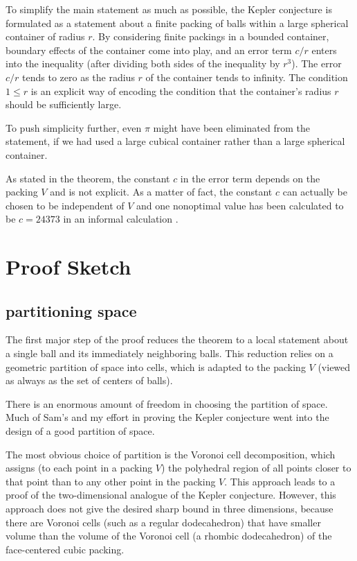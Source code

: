 \documentclass{amsart}
\begin{document}
To simplify the main statement as much as possible, the Kepler
conjecture is formulated as a statement about a finite
packing of balls within a large spherical container of radius $r$.  By
considering finite packings in a bounded container, boundary effects
of the container come into play, and an error term $c/r$ enters into
the inequality (after dividing both sides of the inequality by $r^3$).  
The error $c/r$ tends to zero as the radius $r$ of
the container tends to infinity.
The condition $1\le r$ is an explicit way of encoding the
condition that the container's radius $r$ should be sufficiently large.  

To push simplicity further, even
$\pi$ might have been eliminated from the statement, if we had used a
large cubical container rather than a large spherical container.


As stated in the theorem, the constant $c$ in the error term depends
on the packing $V$ and is not explicit.  As a matter of fact, the
constant $c$ can actually be chosen to be independent of $V$ and one nonoptimal
value has been calculated to be $c=24373$ in an informal calculation
\cite{Scharf}.





\section{Proof Sketch}

\subsection{partitioning space}

The first major step of the proof reduces the theorem to a local
statement about a single ball and its immediately neighboring balls.
This reduction relies on a geometric partition of space into cells,
which is adapted to the packing $V$ (viewed as always as the set of
centers of balls).

There is an enormous amount of freedom in choosing the partition
of space.  Much of Sam's and my effort in proving the Kepler conjecture
went into the design of a good partition of space.  

The most obvious choice of partition is the Voronoi cell
decomposition, which assigns (to each point in a packing $V$) the
polyhedral region of all points closer to that point than to any other
point in the packing $V$. This approach leads to a proof of the two-dimensional
analogue of the Kepler conjecture.  However, this approach does not
give the desired sharp bound in three dimensions, because there are
Voronoi cells (such as a regular dodecahedron) that have smaller
volume than the volume of the Voronoi cell (a rhombic dodecahedron) of
the face-centered cubic packing.
\end{document}
